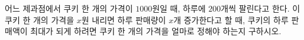 어느 제과점에서 쿠키 한 개의 가격이 $1000$원일 때, 하루에 $200$개씩 팔린다고 한다. 이 쿠키 한 개의 가격을 $x$원 내리면 하루 판매량이 $x$개 증가한다고 할 때, 쿠키의 하루 판매액이 최대가 되게 하려면 쿠키 한 개의 가격을 얼마로 정해야 하는지 구하시오.

